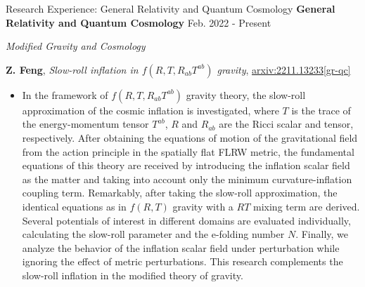 \documentclass[9pt,aspectratio=169,hyperref=colorlinks]{beamer}
\begin{document}
\begin{frame}{Research Experience: General Relativity and Quantum Cosmology}
    \textbf{General Relativity and Quantum Cosmology} \hfill Feb. 2022 - Present

    \smallskip \quad \textit{Modified Gravity and Cosmology}

    \textbf{Z. Feng}, \textit{Slow-roll inflation in $f\left(R, T, R_{ab}T^{ab}\right)$ gravity}, \href{https://arxiv.org/abs/2211.13233}{arxiv:2211.13233[gr-qc]}

    \begin{itemize}
        \item In the framework of $f\left(R, T, R_{ab}T^{ab}\right)$ gravity theory, the slow-roll approximation of the cosmic inflation is investigated, where $T$ is the trace of the energy-momentum tensor $T^{ab}$, $R$ and $R_{ab}$ are the Ricci scalar and tensor, respectively. After obtaining the equations of motion of the gravitational field from the action principle in the spatially flat FLRW metric, the fundamental equations of this theory are received by introducing the inflation scalar field as the matter and taking into account only the minimum curvature-inflation coupling term. Remarkably, after taking the slow-roll approximation, the identical equations as in $f(R, T)$ gravity with a $RT$ mixing term are derived. Several potentials of interest in different domains are evaluated individually, calculating the slow-roll parameter and the e-folding number $N$. Finally, we analyze the behavior of the inflation scalar field under perturbation while ignoring the effect of metric perturbations. This research complements the slow-roll inflation in the modified theory of gravity.
    \end{itemize}
\end{frame}
\end{document}
